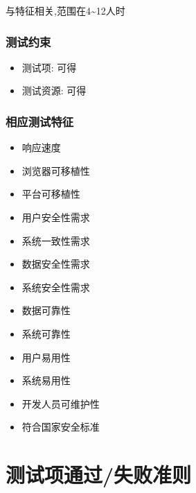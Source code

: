 \documentclass[hyperref, a4paper]{ctexart}
\providecommand{\tightlist}{%
  \setlength{\itemsep}{0pt}\setlength{\parskip}{0pt}}
\begin{document}
与特征相关,范围在4\textasciitilde12人时

\hypertarget{ux6d4bux8bd5ux7ea6ux675f-3}{%
\subsubsection{测试约束}\label{ux6d4bux8bd5ux7ea6ux675f-3}}

\begin{itemize}
\tightlist
\item
  测试项: 可得
\item
  测试资源: 可得
\end{itemize}

\hypertarget{ux76f8ux5e94ux6d4bux8bd5ux7279ux5f81-3}{%
\subsubsection{相应测试特征}\label{ux76f8ux5e94ux6d4bux8bd5ux7279ux5f81-3}}

\begin{itemize}
\tightlist
\item
  响应速度
\item
  浏览器可移植性
\item
  平台可移植性
\item
  用户安全性需求
\item
  系统一致性需求
\item
  数据安全性需求
\item
  系统安全性需求
\item
  数据可靠性
\item
  系统可靠性
\item
  用户易用性
\item
  系统易用性
\item
  开发人员可维护性
\item
  符合国家安全标准
\end{itemize}

\hypertarget{ux6d4bux8bd5ux9879ux901aux8fc7ux5931ux8d25ux51c6ux5219}{%
\section{测试项通过/失败准则}\label{ux6d4bux8bd5ux9879ux901aux8fc7ux5931ux8d25ux51c6ux5219}}
\end{document}
